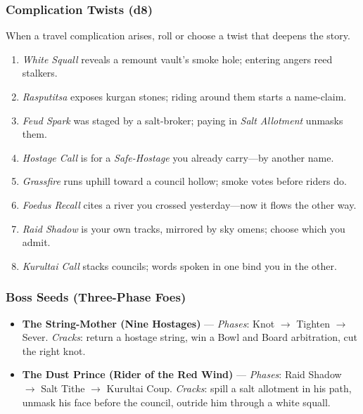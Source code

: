 \subsubsection{Complication Twists (d8)}
\label{sec:ykrul-twists}
When a travel complication arises, roll or choose a twist that deepens the story.
\begin{enumerate}
  \item \emph{White Squall} reveals a remount vault's smoke hole; entering angers reed stalkers.
  \item \emph{Rasputitsa} exposes kurgan stones; riding around them starts a name-claim.
  \item \emph{Feud Spark} was staged by a salt-broker; paying in \emph{Salt Allotment} unmasks them.
  \item \emph{Hostage Call} is for a \emph{Safe-Hostage} you already carry---by another name.
  \item \emph{Grassfire} runs uphill toward a council hollow; smoke votes before riders do.
  \item \emph{Foedus Recall} cites a river you crossed yesterday---now it flows the other way.
  \item \emph{Raid Shadow} is your own tracks, mirrored by sky omens; choose which you admit.
  \item \emph{Kurultai Call} stacks councils; words spoken in one bind you in the other.
\end{enumerate}

\subsubsection{Boss Seeds (Three-Phase Foes)}
\label{sec:ykrul-bosses}
\begin{itemize}[nosep]
  \item \textbf{The String-Mother (Nine Hostages)} --- \emph{Phases}: Knot $\rightarrow$ Tighten $\rightarrow$ Sever. \emph{Cracks}: return a hostage string, win a Bowl and Board arbitration, cut the right knot.
  \item \textbf{The Dust Prince (Rider of the Red Wind)} --- \emph{Phases}: Raid Shadow $\rightarrow$ Salt Tithe $\rightarrow$ Kurultai Coup. \emph{Cracks}: spill a salt allotment in his path, unmask his face before the council, outride him through a white squall.
\end{itemize}

